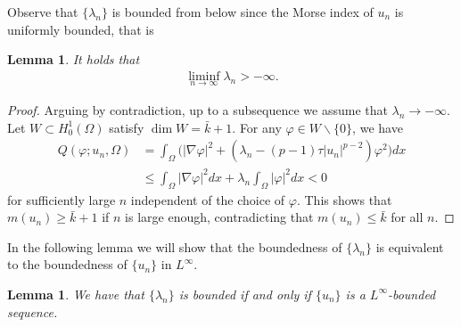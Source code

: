 \documentclass[10pt,a4paper]{article}
\newtheorem{lemma}[theorem]{Lemma}
\theoremstyle{definition} \theoremstyle{remark}
\numberwithin{equation}{section}
\newcommand{\la}{\lambda}
\begin{document}
\vskip0.1in
Observe that $\{\la_n\}$ is bounded from below since the Morse index of $u_n$ is uniformly bounded, that is 

\begin{lemma} \label{lemlanbelow}
	It holds that
	\begin{align*}
		\liminf_{n \to \infty}\la_n > -\infty.
	\end{align*}
\end{lemma}

\begin{proof}
	Arguing by contradiction, up to a subsequence we assume that $\la_n \to -\infty$. Let $W \subset H_0^1(\Omega)$ satisfy $\dim W = \bar k + 1$. For any $\varphi \in W \backslash \{0\}$, we have
	\begin{align*}
		Q(\varphi; u_n, \Omega) & = \int_{\Omega} \bigl(|\nabla \varphi|^2
		+ (\la_n- (p-1)\tau|u_n|^{p-2}) \varphi^2\bigr) dx \\
		& \le \int_{\Omega}|\nabla \varphi|^2dx + \la_n\int_{\Omega}| \varphi|^2dx < 0
	\end{align*}
    for sufficiently large $n$ independent of the choice of $\varphi$. This shows that $m(u_n) \geq \bar k +1$ if $n$ is large enough, contradicting that $m(u_n) \le \bar k$ for all $n$.
\end{proof}

In the following lemma we will show that the boundedness of $\{\la_n\}$ is equivalent to the boundedness of $\{u_n\}$ in $L^\infty$.

\begin{lemma} \label{lemlanbounded}
	We have that $\{\la_n\}$ is bounded if and only if $\{u_n\}$ is a $L^\infty$-bounded sequence.
\end{lemma}
\end{document}
